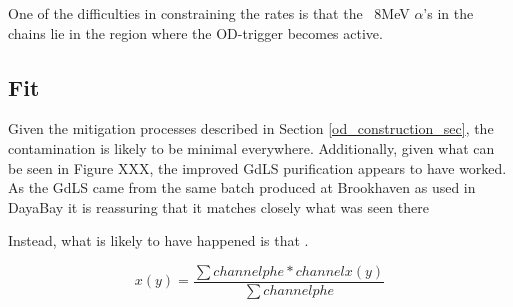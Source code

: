 \par
One of the difficulties in constraining the rates is that the ~8MeV $\alpha$'s in the chains lie in the region where the OD-trigger becomes active.

\subsection{Fit}
\par
Given the mitigation processes described in Section \ref{od_construction_sec}, the contamination is likely to be minimal everywhere. 
Additionally, given what can be seen in Figure XXX, the improved GdLS purification appears to have worked.
As the GdLS came from the same batch produced at Brookhaven as used in DayaBay it is reassuring that it matches closely what was seen there

\par
Instead, what is likely to have happened is that \cite{KamLAND_LS_contaminants_ref}.

\begin{equation}
    x(y) = \frac{\sum{channel phe * channel x (y)}}{\sum{channel phe}}
    \label{eq:OD_xy_position}
\end{equation}
